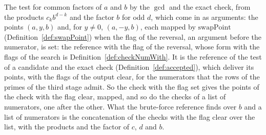 \begin{definition}\label{def:checkNum}
  \leanok
  The test for common factors of $a$ and $b$ by the $\gcd$ and the exact check, from the products
  $c_k b^{d - k}$ and the factor $b$ for odd $d$, which come in as arguments: the points $(a, y, b)$
  and, for $y \ne 0$, $(a, -y, b)$, each mapped by $\mathrm{swapPoint}$
  (Definition~\ref{def:swapPoint}) when the flag of the reversal, an argument before the numerator,
  is set: the reference with the flag of the reversal, whose form with the flags of the search is
  Definition~\ref{def:checkNumWith}. It is the reference of the test of a candidate and the exact
  check (Definition~\ref{def:accepted}), which deliver its points, with the flags of the output
  clear, for the numerators that the rows of the primes of the third stage admit. So the check with
  the flag set gives the points of the check with the flag clear, mapped, and so do the checks of a
  list of numerators, one after the other. What the brute-force reference finds over $b$ and a list
  of numerators is the concatenation of the checks with the flag clear over the list, with the
  products and the factor of $c$, $d$ and $b$.
\end{definition}

